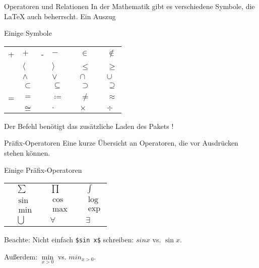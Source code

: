 \begin{frame}[fragile]{Operatoren und Relationen}
In der Mathematik gibt es verschiedene Symbole, die \LaTeX{} auch beherrscht. Ein Auszug
\begin{block}{Einige Symbole}
\small\centering
\begin{tabular}{*{4}{|rl}|}\hline
+ & $+$ & - & $-$ &  & $\in$ &  & $\notin$ \\
 & $\langle$ &  & $\rangle$ &  & $\leq$ &  & $\geq$ \\
 & $\wedge$ &  & $\vee$ &  & $\cap$ &  & $\cup$ \\
 & $\subset$ &  & $\subseteq$ &  & $\supset$ &  & $\supseteq$ \\
= & $=$ &  & $\coloneqq$ &  & $\neq$ &  & $\approx$\\
 & $\cong$ &  & $\cdot$ &  & $\times$ &  & $\div$ \\ \hline
\end{tabular}
\end{block}\pause
Der Befehl  benötigt das zusätzliche Laden des Pakets !
\end{frame}

\begin{frame}[fragile]{Präfix-Operatoren}
Eine kurze Übersicht an Operatoren, die vor Ausdrücken stehen können.
\begin{block}{Einige Präfix-Operatoren}
\centering
\begin{tabular}{*{3}{|rl}|}\hline
{} & $\sum$ &  & $\prod$ &  & $\int$ \\
 & $\sin$ &  & $\cos$ &  & $\log$\\
 & $\min$ &  & $\max$ &  & $\exp$ \\
 & $\bigcup$ &  & $\forall$ &  & $\exists$ \\ \hline
\end{tabular}
\end{block}\pause
\alert{Beachte:} Nicht einfach \texttt{\$sin x\$} schreiben: $sin x$ vs. $\sin x$. 

\medskip\pause
Außerdem: $\min\limits_{x>0}$ vs. $min_{x>0}$. 
\end{frame}

